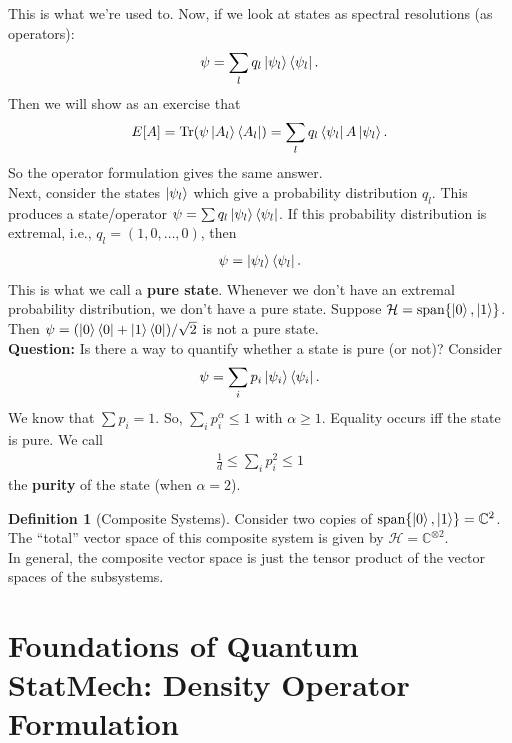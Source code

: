 \documentclass{book}
\theoremstyle{definition}
\newtheorem{defn}{Definition}[section]
\newcommand{\had}{\mathcal{H}}
\newcommand{\al}{\alpha}
\newcommand{\f}[2]{\frac{#1}{#2}}
\begin{document}
This is what we're used to. Now, if we look at states as spectral resolutions (as operators):
\begin{align}
\psi = \sum_l q_l \ket{\psi_l}\bra{\psi_l}.
\end{align}
Then we will show as an exercise that
\begin{align}
E[A] = \Tr (\psi \ket{A_l}\bra{A_l}) = \sum_l q_l \bra{\psi_l} A \ket{\psi_l}.
\end{align}
So the operator formulation gives the same answer. \\


Next, consider the states $\ket{\psi_l}$ which give a probability distribution $q_l$. This produces a state/operator $\psi = \sum q_l \ket{\psi_l}\bra{\psi_l}$. If this probability distribution is extremal, i.e., $q_l = (1,0,\dots,0)$, then 
\begin{align}
\psi = \ket{\psi_l}\bra{\psi_l}.
\end{align}
This is what we call a \textbf{pure state}. Whenever we don't have an extremal probability distribution, we don't have a pure state. Suppose $\had = \text{span}\{ \ket{0}, \ket{1} \}$. Then $\psi = (\ket{0}\bra{0} + \ket{1}\bra{0})/\sqrt{2}$ is not a pure state. \\

\textbf{Question:} Is there a way to quantify whether a state is pure (or not)?  Consider
\begin{align}
\psi = \sum_i p_i \ket{\psi_i}\bra{\psi_i}.
\end{align}
We know that $\sum p_i = 1$. So, $\sum_i p_i^\al \leq 1$ with $\al\geq 1$. Equality occurs iff the state is pure. We call 
\begin{align}
\f{1}{d} \leq \sum_i p_i^2 \leq 1
\end{align}
the \textbf{purity} of the state (when $\al = 2$). \\

\begin{defn}[Composite Systems]
	Consider two copies of $\text{span}\{ \ket{0}, \ket{1} \} = \mathbb{C}^2$. The ``total'' vector space of this composite system is given by $\had = \mathbb{C}^{\otimes 2}$. \\
	
	In general, the composite vector space is just the tensor product of the vector spaces of the subsystems. 
\end{defn}




\newpage

\section{Foundations of Quantum StatMech: Density Operator Formulation}
\end{document}
